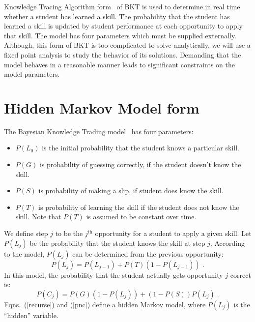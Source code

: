 \documentclass{acmlarge-edm}
\begin{document}

Knowledge Tracing Algorithm form~\cite{corbett_knowledge_1995} 
of BKT is used to 
determine in real time whether a student has learned a skill.
The probability that the student has learned a skill is 
updated by student performance at each opportunity to apply
that skill.  The model has four parameters which must be 
supplied externally.  Although, this form of BKT is too complicated
to solve analytically, we will use a fixed point analysis to
study the behavior of its solutions.  Demanding that the model behaves
in a reasonable manner leads to significant constraints on the model parameters.

\section{Hidden Markov Model form}

The Bayesian Knowledge Trading model~\cite{corbett_knowledge_1995} 
has four parameters:
%
\begin{itemize}
   \item $P(L_0)$ is the initial probability that the student knows a particular skill.
   \item $P(G)$ is probability of guessing correctly, if the student        
         doesn't know the skill.
   \item $P(S)$ is probability of making a slip, if student does know the skill.
   \item $P(T)$ is probability of learning the skill if the student 
         does not know the skill.  Note that $P(T)$ is assumed to 
         be constant over time.
\end{itemize}
%
We define step $j$ to be the $j^\mathrm{th}$ opportunity for a student
to apply a given skill.
Let $P(L_j)$ be the probability that the student knows the skill at 
step $j$. According to the model,  $P(L_j)$ can
be determined from the previous opportunity:
%
\begin{equation}
          P(L_j) = P(L_{j-1}) + P(T)\left(1-P(L_{j-1})\right)  \; . 
        \label{recurse}
\end{equation}
%
In this model, the probability that the student actually gets
opportunity $j$ correct is:
%
\begin{equation}
        P(C_j) = P(G)\left(1-P(L_j)\right) + \left(1-P(S)\right) P(L_j) \; . 
         \label{pnc}
\end{equation}
%
Eqns.~(\ref{recurse}) and (\ref{pnc}) define a hidden Markov model, 
where $P(L_j)$ is the ``hidden'' variable.
\end{document}
